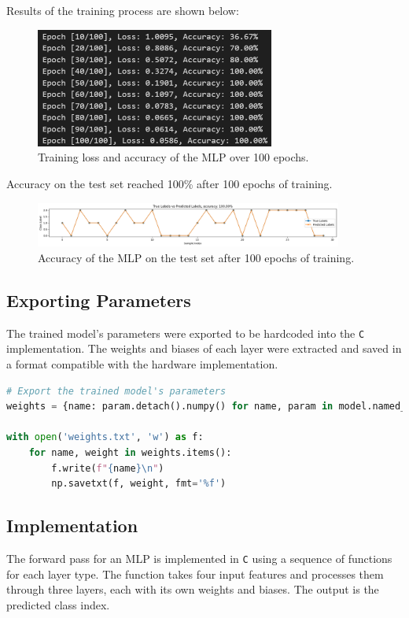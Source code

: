 \documentclass{article}
\begin{document}
Results of the training process are shown below:
\begin{figure}[H]
    \centering
    \includegraphics[width=0.7\textwidth]{./assets/MLP-training.png}
    \caption{Training loss and accuracy of the MLP over 100 epochs.}
    \label{fig:mlp-training}
\end{figure}

Accuracy on the test set reached 100\% after 100 epochs of training.
\begin{figure}[H]
    \centering
    \includegraphics[width=0.9\textwidth]{./assets/MLP-accuracy.png}
    \caption{Accuracy of the MLP on the test set after 100 epochs of training.}
    \label{fig:mlp-accuracy}
\end{figure}

\subsection{Exporting Parameters}
The trained model's parameters were exported to be hardcoded into the \texttt{C} implementation. The weights and biases of each layer were extracted and saved in a format compatible with the hardware implementation.
\begin{lstlisting}[language=Python]
# Export the trained model's parameters
weights = {name: param.detach().numpy() for name, param in model.named_parameters()}

with open('weights.txt', 'w') as f:
    for name, weight in weights.items():
        f.write(f"{name}\n")
        np.savetxt(f, weight, fmt='%f')
\end{lstlisting}

\subsection{Implementation}
The forward pass for an MLP is implemented in \texttt{C} using a sequence of functions for each layer type. The function takes four input features and processes them through three layers, each with its own weights and biases. The output is the predicted class index.
\end{document}
